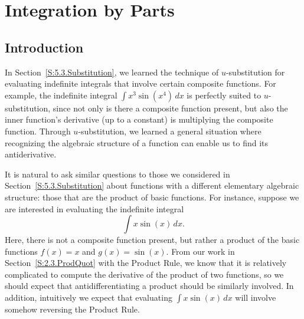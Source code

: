\section{Integration by Parts} \label{S:5.4.Parts}

\vspace*{-14 pt}

\subsection*{Introduction}

In Section~\ref{S:5.3.Substitution}, we learned the technique of $u$-substitution for evaluating indefinite integrals that involve certain composite functions.  For example, the indefinite integral $\int x^3 \sin(x^4) \, dx$ is perfectly suited to $u$-substitution, since not only is there a composite function present, but also the inner function's derivative (up to a constant) is multiplying the composite function.  Through $u$-substitution, we learned a general situation where recognizing the algebraic structure of a function can enable us to find its antiderivative.  

It is natural to ask similar questions to those we considered in Section~\ref{S:5.3.Substitution} about functions with a different elementary algebraic structure:  those that are the product of basic functions.  For instance, suppose we are interested in evaluating the indefinite integral
$$\int x \sin(x) \, dx.$$
Here, there is not a composite function present, but rather a product of the basic functions $f(x) = x$ and $g(x) = \sin(x)$.  From our work in Section~\ref{S:2.3.ProdQuot} with the Product Rule, we know that it is relatively complicated to compute the derivative of the product of two functions, so we should expect that antidifferentiating a product should be similarly involved.  In addition, intuitively we expect that evaluating $\int x \sin(x) \, dx$ will involve somehow reversing the Product Rule.

